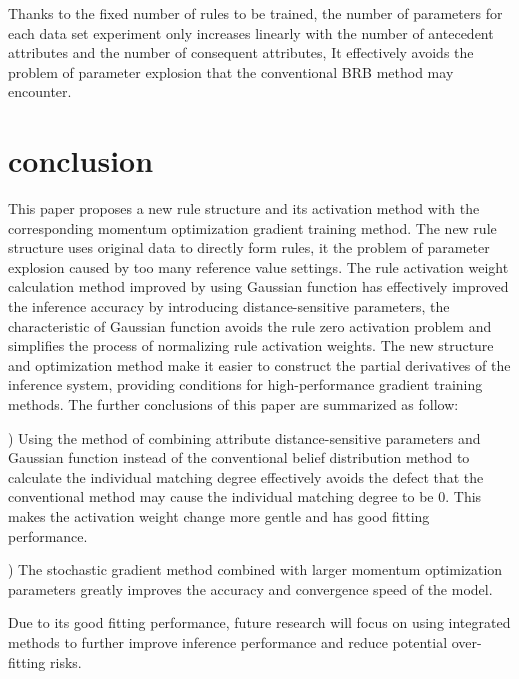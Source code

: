 \documentclass{ieeeaccess}
\begin{document}
Thanks to the fixed number of rules to be trained, the number of parameters for each data set experiment only increases linearly with the number of antecedent attributes and the number of consequent attributes,
It effectively avoids the problem of parameter explosion that the conventional BRB method may encounter.

\section{conclusion}
This paper proposes a new rule structure and its activation method with the corresponding momentum optimization gradient training method.
The new rule structure uses original data to directly form rules, it the problem of parameter explosion caused by too many reference value settings.
The rule activation weight calculation method improved by using Gaussian function has effectively improved the inference accuracy by introducing distance-sensitive parameters,
the characteristic of Gaussian function avoids the rule zero activation problem and simplifies the process of normalizing rule activation weights.
The new structure and optimization method make it easier to construct the partial derivatives of the inference system,
providing conditions for high-performance gradient training methods.
The further conclusions of this paper are summarized as follow:

) Using the method of combining attribute distance-sensitive parameters and Gaussian function instead of
the conventional belief distribution method to calculate the individual matching degree effectively avoids the defect that
the conventional method may cause the individual matching degree to be 0.
This makes the activation weight change more gentle and has good fitting performance.

) The stochastic gradient method combined with larger momentum optimization parameters greatly improves the accuracy and convergence speed of the model.

Due to its good fitting performance, future research will focus on using integrated methods to further improve inference performance and reduce potential over-fitting risks.
\end{document}
